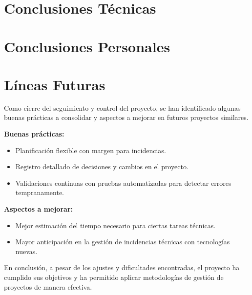 \section{Conclusiones Técnicas}

\section{Conclusiones Personales}

\section{Líneas Futuras}


Como cierre del seguimiento y control del proyecto, se han identificado algunas buenas prácticas a consolidar y aspectos a mejorar en futuros proyectos similares.

\textbf{Buenas prácticas:}
\begin{itemize}
    \item Planificación flexible con margen para incidencias.
    \item Registro detallado de decisiones y cambios en el proyecto.
    \item Validaciones continuas con pruebas automatizadas para detectar errores tempranamente.
\end{itemize}

\textbf{Aspectos a mejorar:}
\begin{itemize}
    \item Mejor estimación del tiempo necesario para ciertas tareas técnicas.
    \item Mayor anticipación en la gestión de incidencias técnicas con tecnologías nuevas.
\end{itemize}

En conclusión, a pesar de los ajustes y dificultades encontradas, el proyecto ha cumplido sus objetivos y ha permitido aplicar metodologías de gestión de proyectos de manera efectiva.